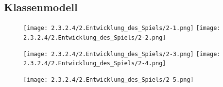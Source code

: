 \documentclass{scrartcl}   %
\begin{document}
\subsection{Klassenmodell}


\begin{figure}[ht]
	\texttt{[image: 2.3.2.4/2.Entwicklung\_des\_Spiels/2-1.png]}
	\hspace{0.5cm}
	\texttt{[image: 2.3.2.4/2.Entwicklung\_des\_Spiels/2-2.png]}
\end{figure}

\begin{figure}[ht]
	\texttt{[image: 2.3.2.4/2.Entwicklung\_des\_Spiels/2-3.png]}
	\hspace{0.5cm}
	\texttt{[image: 2.3.2.4/2.Entwicklung\_des\_Spiels/2-4.png]}
\end{figure}

\begin{figure}[ht]
	\texttt{[image: 2.3.2.4/2.Entwicklung\_des\_Spiels/2-5.png]}
\end{figure}

\newpage
\end{document}
